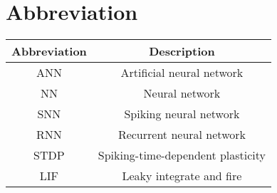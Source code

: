 \chapter*{\centering Abbreviation}%
\begin{center}
\end{center}
\begin{center}
    \begin{tabular}{ c c   }
        \hline
        Abbreviation & Description                       \\
        \hline
        ANN          & Artificial neural network         \\
        NN           & Neural network                    \\
        SNN          & Spiking neural network            \\
        RNN          & Recurrent neural network          \\
        STDP         & Spiking-time-dependent plasticity \\
        LIF          & Leaky integrate and fire          \\

        \hline
    \end{tabular}
\end{center}